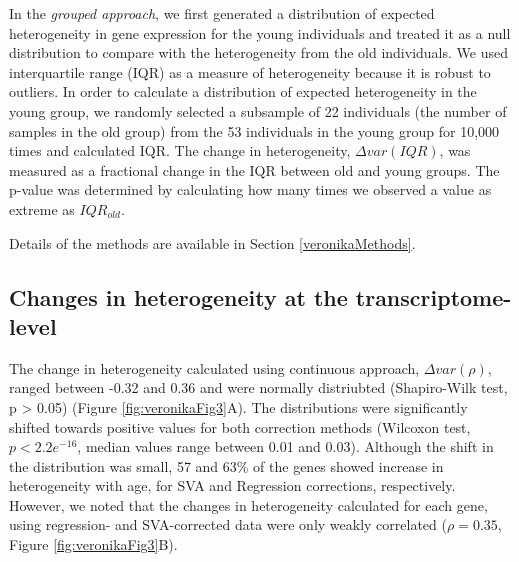 \documentclass[12pt,twoside]{unicam}
\begin{document}
In the \emph{grouped approach}, we first generated a distribution of expected heterogeneity in gene expression for the young individuals and treated it as a null distribution to compare with the heterogeneity from the old individuals. We used interquartile range (IQR) as a measure of heterogeneity because it is robust to outliers. In order to calculate a distribution of expected heterogeneity in the young group, we randomly selected a subsample of 22 individuals (the number of samples in the old group) from the 53 individuals in the young group for 10,000 times and calculated IQR. The change in heterogeneity, \(\Delta var(IQR)\), was measured as a fractional change in the IQR between old and young groups. The p-value was determined by calculating how many times we observed a value as extreme as \(IQR_{old}\).

Details of the methods are available in Section \ref{veronikaMethods}.

\hypertarget{changes-in-heterogeneity-at-the-transcriptome-level}{%
\subsection{Changes in heterogeneity at the transcriptome-level}\label{changes-in-heterogeneity-at-the-transcriptome-level}}

The change in heterogeneity calculated using continuous approach, \(\Delta var (\rho)\), ranged between -0.32 and 0.36 and were normally distriubted (Shapiro-Wilk test, p \textgreater{} 0.05) (Figure \ref{fig:veronikaFig3}A). The distributions were significantly shifted towards positive values for both correction methods (Wilcoxon test, \(p<2.2e^{-16}\), median values range between 0.01 and 0.03). Although the shift in the distribution was small, 57 and 63\% of the genes showed increase in heterogeneity with age, for SVA and Regression corrections, respectively. However, we noted that the changes in heterogeneity calculated for each gene, using regression- and SVA-corrected data were only weakly correlated (\(\rho = 0.35\), Figure \ref{fig:veronikaFig3}B).
\end{document}
